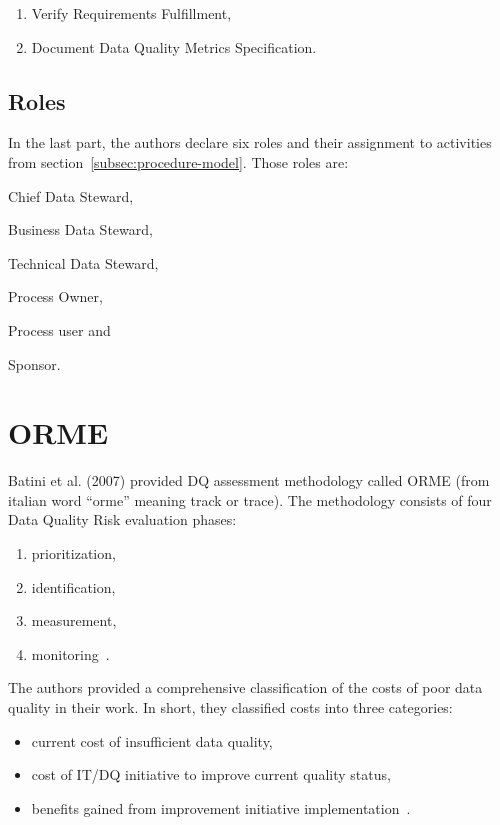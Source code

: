 \begin{enumerate}
    \item Verify Requirements Fulfillment,
    \item Document Data Quality Metrics Specification.
\end{enumerate}

\subsection{Roles}

In the last part, the authors declare six roles and their assignment to activities from section~\ref{subsec:procedure-model}.
Those roles are:
\begin{enumerate*}[label=(\roman*)]
    \item Chief Data Steward,
    \item Business Data Steward,
    \item Technical Data Steward,
    \item Process Owner,
    \item Process user and
    \item Sponsor.
\end{enumerate*}

\section{ORME}

Batini et al. (2007) provided DQ assessment methodology called ORME (from italian word \enquote{orme} meaning track or trace).
The methodology consists of four Data Quality Risk evaluation phases:
\begin{enumerate}
    \item prioritization,
    \item identification,
    \item measurement,
    \item monitoring~\cite{batini2007}.
\end{enumerate}

The authors provided a comprehensive classification of the costs of poor data quality in their work.
In short, they classified costs into three categories:
\begin{itemize}
    \item current cost of insufficient data quality,
    \item cost of IT/DQ initiative to improve current quality status,
    \item benefits gained from improvement initiative implementation~\cite{batini2007}.
\end{itemize}

